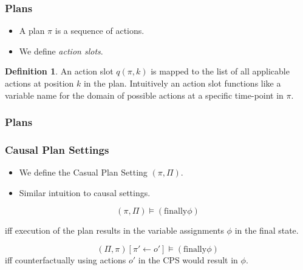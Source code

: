 \documentclass{beamer}
\theoremstyle{plain}
\theoremstyle{definition}
\newtheorem{defn}[thm]{Definition} %
\begin{document}
\begin{frame}
\frametitle{Plans}
\begin{itemize}
\item A plan $\pi$ is a sequence of actions. 

\item We define \textit{action slots}. 

\end{itemize}


\begin{defn}
An action slot $q(\pi,k)$ is mapped to the list of all applicable actions at position $k$ in the plan. Intuitively an action slot functions like a variable name for the domain of possible actions at a specific time-point in $\pi$.
\end{defn}

\end{frame}

\begin{frame}
\frametitle{Plans}

\end{frame}


\begin{frame}
\frametitle{Causal Plan Settings}
\begin{itemize}
\item We define the Casual Plan Setting $(\pi, \Pi)$.
\item Similar intuition to causal settings.
\newline
\end{itemize}


\[
(\pi,\Pi)\models (\textrm{finally} \phi)
\]

iff execution of the plan results in the variable assignments $\phi$ in the final state.

\[
(\Pi, \pi)[\pi'\leftarrow o'] \models (\textrm{finally} \phi)
\]
iff counterfactually using actions $o'$ in the CPS would result in $\phi$.

\end{frame}
\end{document}
